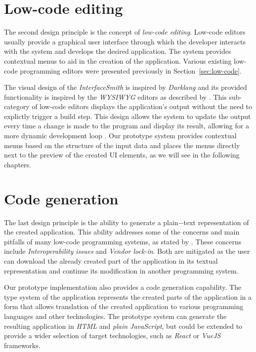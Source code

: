 \section{Low-code editing}

The second design principle is the concept of \emph{low-code editing}.
Low-code editors usually provide a graphical user interface through which the developer interacts with the system and develops the desired application.
The system provides contextual menus to aid in the creation of the application.
Various existing low-code programming editors were presented previously in Section~\ref{sec:low-code}.

The visual design of the \emph{InterfaceSmith} is inspired by \emph{Darklang} and its provided functionality is inspired by the \emph{WYSIWYG} editors as described by \citet{Yang_Gupta_Botev_Churchill_Levchenko_Shanmugasundaram_2008}.
This sub-category of low-code editors displays the application's output without the need to explictly trigger a build step.
This design allows the system to update the output every time a change is made to the program and display its result, allowing for a more dynamic development loop \cite{output-directed-programming}.
Our prototype system provides contextual menus based on the structure of the input data and places the menus directly next to the preview of the created UI elements, as we will see in the following chapters.

\section{Code generation}

The last design principle is the ability to generate a plain−text representation of the created application.
This ability addresses some of the concerns and main pitfalls of many low-code programming systems, as stated by \citet{Pinho_Aguiar_Amaral_2023}.
These concerns include \emph{Interoperability issues} and \emph{Vendor lock-in}.
Both are mitigated as the user can download the already created part of the application in its textual representation and continue its modification in another programming system.

Our prototype implementation also provides a code generation capability.
The type system of the application represents the created parts of the application in a form that allows translation of the created application to various programming languages and other technologies.
The prototype system can generate the resulting application in \emph{HTML} and \emph{plain JavaScript}, but could be extended to provide a wider selection of target technologies,
such as \emph{React} or \emph{VueJS} frameworks.
